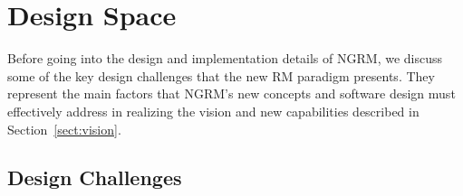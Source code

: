 \documentclass[10pt]{article}
\newcommand{\ngrm}{NGRM}
\begin{document}
\section{Design Space}
\label{sect:designspace}

Before going into the design and implementation details of \ngrm, we discuss 
some of the key design challenges that the new RM paradigm presents. 
They represent the main factors that \ngrm's new concepts and software design
must effectively address in realizing the vision and new capabilities described in 
Section~\ref{sect:vision}. 

\subsection{Design Challenges}
\label{sect:challenges}
\end{document}
